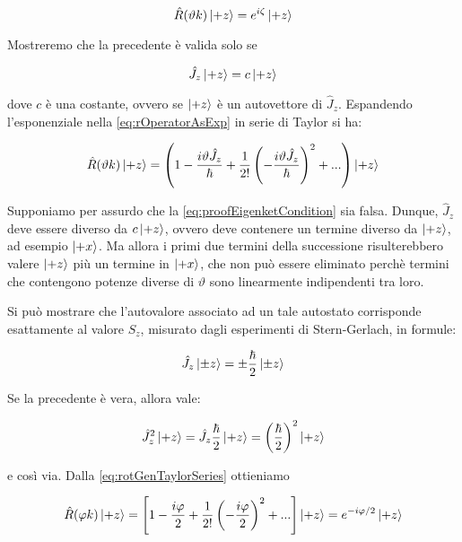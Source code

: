 	\begin{equation}
		\hat{R} (\vartheta k) \ket{+z} = e^{i \zeta} \ket{+z}
	\end{equation}

Mostreremo che la precedente \`e valida solo se

	\begin{equation} \label{eq:proofEigenketCondition}
		\hat{J}_z \ket{+z} = c \ket{+z}
	\end{equation}

dove $c$ \`e una costante, ovvero se $\ket{+z}$ \`e un autovettore di $\hat{J}_z$. Espandendo l'esponenziale nella \eqref{eq:rOperatorAsExp} in serie di Taylor si ha:

	\begin{equation} \label{eq:rotGenTaylorSeries}
		\hat{R} (\vartheta k) \ket{+z} = \left ( 1 - \frac{i \vartheta \hat{J}_z}{\hbar} + \frac{1}{2!} \left ( - \frac{i \vartheta \hat{J}_z}{\hbar} \right )^2 + ... \right ) \ket{+z}
	\end {equation}

Supponiamo per assurdo che la \eqref{eq:proofEigenketCondition} sia falsa. Dunque, $\hat{J}_z$ deve essere diverso da $c \ket{+z}$, ovvero deve contenere un termine diverso da $\ket{+z}$, ad esempio $\ket{+x}$. Ma allora i primi  due termini della successione risulterebbero valere $\ket{+z}$ pi\`u un termine in $\ket{+x}$, che non pu\`o essere eliminato perch\`e termini che contengono potenze diverse di $\vartheta$ sono linearmente indipendenti tra loro.

Si pu\`o mostrare che l'autovalore associato ad un tale autostato corrisponde esattamente al valore $S_z$, misurato dagli esperimenti di Stern-Gerlach, in formule:
 
 	\begin{equation}
 		\hat{J}_z \ket{\pm z} = \pm \frac{\hbar}{2} \ket{\pm z}
 	\end{equation}
 
Se la precedente \`e vera, allora vale:
 
 	\begin{equation}
 		\hat{J}_z^2 \ket{+z} = \hat{J}_z \frac{\hbar}{2} \ket{+z} = \left ( \frac{\hbar}{2} \right ) ^ 2 \ket{+z}
 	\end{equation}
 
e cos\`i via. Dalla \eqref{eq:rotGenTaylorSeries} ottieniamo
 
 	\begin{equation} \label{eq:rotateSpinUp}
 		\hat{R}( \varphi k) \ket{+z} = \left [ 1 - \frac{i \varphi}{2} + \frac{1}{2!} \left ( - \frac{i \varphi}{2} \right )^2 + ... \right ] \ket{+z} = e^{-i \varphi / 2} \ket{+z}
 	\end{equation}
 
